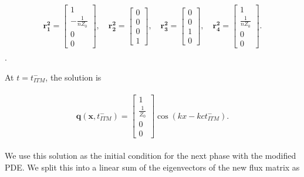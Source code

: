 \begin{align}
    \begin{split}
    \mathbf{r_1^2} = \begin{bmatrix}
        1 \\
-\frac{1}{n Z_0} \\
0 \\
0
        \end{bmatrix}, \quad
        \mathbf{r_2^2} = \begin{bmatrix}
            0 \\
0 \\
0 \\
1
            \end{bmatrix}, \quad
            \mathbf{r_3^2} = \begin{bmatrix}
                0 \\
                0 \\
                1 \\
                0
                \end{bmatrix}, \quad
                \mathbf{r_4^2} = \begin{bmatrix}
                    1 \\
                    \frac{1}{n Z_0} \\
                    0 \\
                    0                    
                \end{bmatrix}.
    \end{split}
\end{align} .

At $t = t_{ITM}^-$, the solution is 

\begin{align}
    \begin{split}
        \mathbf{q}\left(\mathbf{x}, t_{ITM}^-\right) = \begin{bmatrix}
            1 \\
            \frac{1}{Z_0} \\
            0 \\
            0
            \end{bmatrix} \cos\left(kx - k c t_{ITM}^-\right) .
    \end{split}
    \label{eq:initphase2}
\end{align}

We use this solution as the initial condition for the next phase with the modified PDE. We split this into a linear sum of the eigenvectors of the new flux matrix
as 

